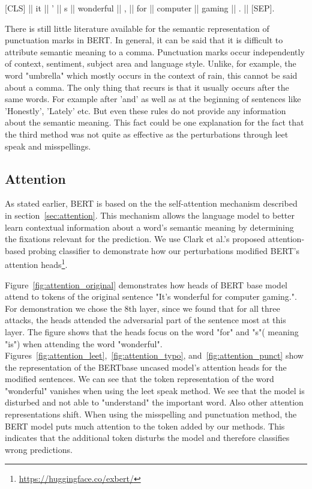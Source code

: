 {[}CLS{]}  ||  it  ||  '  ||  s  ||  wonderful  || , ||  for  ||  computer  ||  gaming  ||  .  ||  {[}SEP{]}.

There is still little literature available for the semantic representation of punctuation marks in BERT. In general, it can be said that it is difficult to attribute semantic meaning to a comma. Punctuation marks occur independently of context, sentiment, subject area and language style. Unlike, for example, the word "umbrella" which mostly occurs in the context of rain, this cannot be said about a comma. The only thing that recurs is that it usually occurs after the same words. For example after 'and' as well as at the beginning of sentences like 'Honestly', 'Lately' etc. But even these rules do not provide any information about the semantic meaning. This fact could be one explanation for the fact that the third method was not quite as effective as the perturbations through leet speak and misspellings.


\subsection{Attention}
As stated earlier, BERT is based on the the self-attention mechanism described in section~\ref{sec:attention}. This mechanism allows the language model to better learn contextual information about a word’s semantic meaning by determining the fixations relevant for the prediction. We use Clark et al.'s proposed attention-based probing classifier to demonstrate how our perturbations modified BERT's attention heads\footnote{\url{https://huggingface.co/exbert/}}\cite{clark2019does}. 

Figure~\ref{fig:attention_original} demonstrates how heads of BERT base model attend to tokens of the original sentence "It's wonderful for computer gaming.". For demonstration we chose the 8th layer, since we found that for all three attacks, the heads attended the adversarial part of the sentence most at this layer.
The figure shows that the heads focus on the word "for" and "s"( meaning "is") when attending the word "wonderful". 
Figures~\ref{fig:attention_leet},~\ref{fig:attention_typo}, and~\ref{fig:attention_punct} show the representation of the  BERTbase uncased model's attention heads for the modified sentences. We can see that the token representation of the word "wonderful" vanishes when using the leet speak method. We see that the model is disturbed and not able to "understand" the important word. Also other attention representations shift. When using the misspelling and punctuation method, the BERT model puts much attention to the token added by our methods. This indicates that the additional token disturbs the model and therefore classifies wrong predictions.


